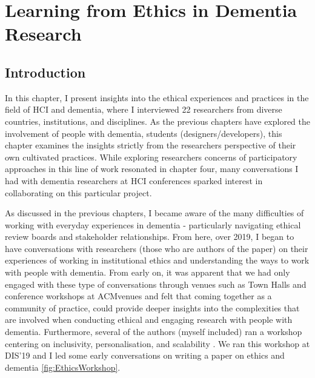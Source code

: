 \chapter{Learning from Ethics in Dementia Research}
\label{EthicsChapter}

\section{Introduction}
\label{Ethics:Intro}
In this chapter, I present insights into the ethical experiences and practices in the field of HCI and dementia, where I interviewed 22 researchers from diverse countries, institutions, and disciplines. As the previous chapters have explored the involvement of people with dementia, students (designers/developers), this chapter examines the insights strictly from the researchers perspective of their own cultivated practices. While exploring researchers concerns of participatory approaches in this line of work resonated in chapter four, many conversations I had with dementia researchers at HCI conferences sparked interest in collaborating on this particular project. 


As discussed in the previous chapters, I became aware of the many difficulties of working with everyday experiences in dementia - particularly navigating ethical review boards and stakeholder relationships. From here, over 2019, I began to have  conversations with researchers (those who are authors of the paper) on their experiences of working in institutional ethics and understanding the ways to work with people with dementia. From early on, it was apparent that we had only engaged with these type of conversations through venues such as Town Halls \citep{munteanu_sigchi_2019,bruckman_cscw_2017,frauenberger_research_2017} and conference workshops at ACMvenues \citep{waycott_ethical_2015,lazar_hcixdementia_2018} and felt that coming together as a community of practice, could provide deeper insights into the complexities that are involved when conducting ethical and engaging research with people with dementia. Furthermore, several of the authors (myself included) ran a workshop centering on inclusivity, personalisation, and scalability \citep{brankaert_intersections_2019}. We ran this workshop at DIS'19 and I led some early conversations on writing a paper on ethics and dementia \ref{fig:EthicsWorkshop}. 

